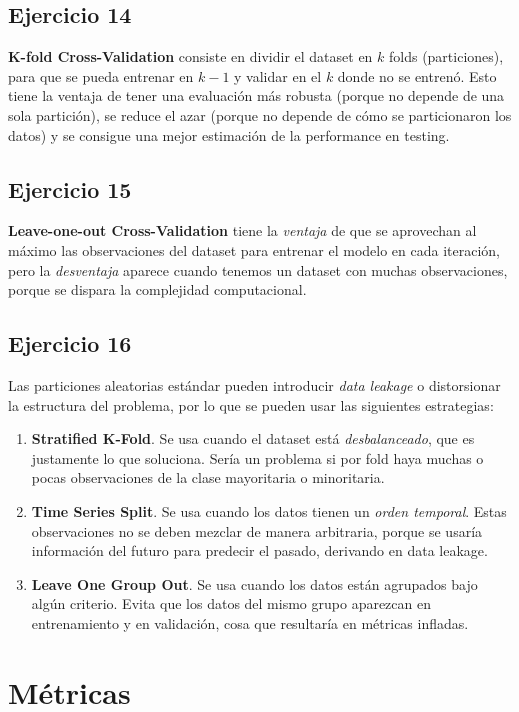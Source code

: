 \documentclass[a4paper,12pt]{article}
\begin{document}
        \subsection*{Ejercicio 14}
            \noindent \textbf{K-fold Cross-Validation} consiste en dividir el dataset en $k$ folds (particiones), para que se pueda entrenar en $k-1$ y validar en el $k$ donde no se entrenó. Esto tiene la ventaja de tener una evaluación más robusta (porque no depende de una sola partición), se reduce el azar (porque no depende de cómo se particionaron los datos) y se consigue una mejor estimación de la performance en testing.
        \subsection*{Ejercicio 15}
            \noindent \textbf{Leave-one-out Cross-Validation} tiene la \emph{ventaja} de que se aprovechan al máximo las observaciones del dataset para entrenar el modelo en cada iteración, pero la \emph{desventaja} aparece cuando tenemos un dataset con muchas observaciones, porque se dispara la complejidad computacional.
        \subsection*{Ejercicio 16}
            \noindent Las particiones aleatorias estándar pueden introducir \emph{data leakage} o distorsionar la estructura del problema, por lo que se pueden usar las siguientes estrategias:
            \begin{enumerate}
                \item \textbf{Stratified K-Fold}. Se usa cuando el dataset está \emph{desbalanceado}, que es justamente lo que soluciona. Sería un problema si por fold haya muchas o pocas observaciones de la clase mayoritaria o minoritaria.
                \item \textbf{Time Series Split}. Se usa cuando los datos tienen un \emph{orden temporal}. Estas observaciones no se deben mezclar de manera arbitraria, porque se usaría información del futuro para predecir el pasado, derivando en data leakage.
                \item \textbf{Leave One Group Out}. Se usa cuando los datos están agrupados bajo algún criterio. Evita que los datos del mismo grupo aparezcan en entrenamiento y en validación, cosa que resultaría en métricas infladas.
            \end{enumerate}
    \section*{Métricas}
\end{document}

